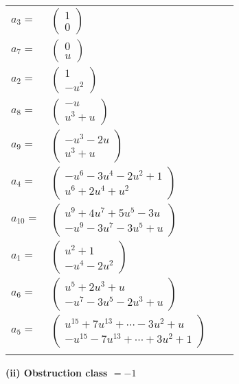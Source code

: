 \documentclass[1p]{elsarticle_modified}
\theoremstyle{definition}
\begin{document}
\begin{tabular}{m{7pt} m{180pt} m{7pt} m{180pt} }
\flushright $a_{3}=$&$\begin{pmatrix}1\\0\end{pmatrix}$ \\
\flushright $a_{7}=$&$\begin{pmatrix}0\\u\end{pmatrix}$ \\
\flushright $a_{2}=$&$\begin{pmatrix}1\\- u^2\end{pmatrix}$ \\
\flushright $a_{8}=$&$\begin{pmatrix}- u\\u^3+u\end{pmatrix}$ \\
\flushright $a_{9}=$&$\begin{pmatrix}- u^3-2 u\\u^3+u\end{pmatrix}$ \\
\flushright $a_{4}=$&$\begin{pmatrix}- u^6-3 u^4-2 u^2+1\\u^6+2 u^4+u^2\end{pmatrix}$ \\
\flushright $a_{10}=$&$\begin{pmatrix}u^9+4 u^7+5 u^5-3 u\\- u^9-3 u^7-3 u^5+u\end{pmatrix}$ \\
\flushright $a_{1}=$&$\begin{pmatrix}u^2+1\\- u^4-2 u^2\end{pmatrix}$ \\
\flushright $a_{6}=$&$\begin{pmatrix}u^5+2 u^3+u\\- u^7-3 u^5-2 u^3+u\end{pmatrix}$ \\
\flushright $a_{5}=$&$\begin{pmatrix}u^{15}+7 u^{13}+\cdots-3 u^2+u\\- u^{15}-7 u^{13}+\cdots+3 u^2+1\end{pmatrix}$\\&\end{tabular}
\flushleft \textbf{(ii) Obstruction class $= -1$}\\~\\
\end{document}
